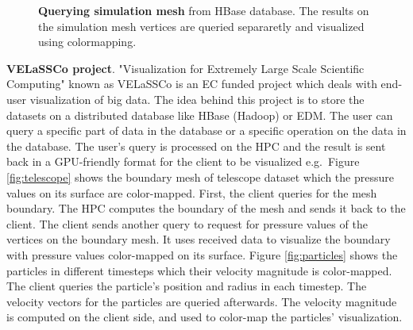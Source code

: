 \documentclass[]{report}
\begin{document}
\begin{figure}[!ht]
	\hfill
	\hfill
	\hfill
	\caption[Getting simulation mesh informaton]{\textbf{Querying simulation mesh} from HBase database. The results on the simulation mesh vertices are queried separaretly and visualized using colormapping.}
	\label{fig:sim_meshes}
\end{figure}


\textbf{VELaSSCo project}. "Visualization for Extremely Large Scale Scientific Computing" known as VELaSSCo is an EC funded project which deals with end-user visualization of big data. The idea behind this project is to store the datasets on a distributed database like HBase (Hadoop) or EDM. The user can query a specific part of data in the database or a specific operation on the data in the database. The user's query is processed on the HPC and the result is sent back in a GPU-friendly format for the client to be visualized e.g.~Figure \ref{fig:telescope} shows the boundary mesh of telescope dataset which the pressure values on its surface are color-mapped. First, the client queries for the mesh boundary. The HPC computes the boundary of the mesh and sends it back to the client. The client sends another query to request for pressure values of the vertices on the boundary mesh. It uses received data to visualize the boundary with pressure values color-mapped on its surface. Figure \ref{fig:particles} shows the particles in different timesteps which their velocity magnitude is color-mapped. The client queries the particle's position and radius in each timestep. The velocity vectors for the particles are queried afterwards. The velocity magnitude is computed on the client side, and used to color-map the particles' visualization. 
\end{document}

